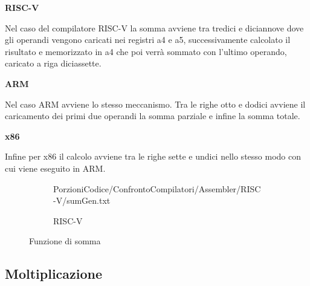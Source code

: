 \documentclass[12pt,a4paper]{report}
\begin{document}
\vspace{0.3 cm}
\textbf{RISC-V}

Nel caso del compilatore RISC-V la somma avviene tra tredici e diciannove dove gli operandi vengono caricati nei registri a4 e a5,  successivamente calcolato il risultato e memorizzato in a4 che poi verrà sommato con l'ultimo operando, caricato a riga diciassette.

\vspace{0.3 cm}
\textbf{ARM}

Nel caso ARM avviene lo stesso meccanismo. Tra le righe otto e dodici avviene il caricamento dei primi due operandi la somma parziale e infine la somma totale.

\vspace{0.3 cm}
\textbf{x86}

Infine per x86 il calcolo avviene tra le righe sette e undici nello stesso modo con cui viene eseguito in ARM.

\begin{figure}[h]
     
     \begin{subfigure}[b]{0.3\textwidth}
  
         {PorzioniCodice/ConfrontoCompilatori/Assembler/RISC-V/sumGen.txt}
	\label{Code:Add2RISC}
\caption{RISC-V}
     \end{subfigure}
     \hfill
     \begin{subfigure}[b]{0.3\textwidth}
         
          
          \label{Code:Add2ARM}

     \end{subfigure}
     \hfill
     \begin{subfigure}[b]{0.3\textwidth}
         
          
	 
	\label{Code:Add2X86}
     \end{subfigure}
    
        \caption{Funzione di somma}
        \label{Fig:code2}
\end{figure}



\subsection{Moltiplicazione}
\end{document}
